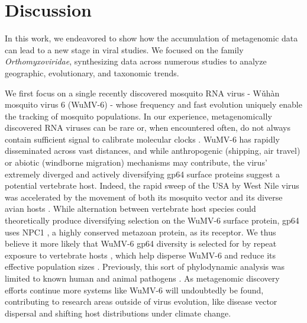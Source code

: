 \documentclass[11pt,twocolumn]{article}
\begin{document}
\section{Discussion}

In this work, we endeavored to show how the accumulation of metagenomic data can lead to a new stage in viral studies. We focused on the family \textit{Orthomyxoviridae}, synthesizing data across numerous studies to analyze geographic, evolutionary, and taxonomic trends.


We first focus on a single recently discovered mosquito RNA virus - W\v{u}h\`{a}n mosquito virus 6 \citep{li_unprecedented_2015} (WuMV-6) - whose frequency and fast evolution uniquely enable the tracking of mosquito populations. In our experience, metagenomically discovered RNA viruses can be rare or, when encountered often, do not always contain sufficient signal to calibrate molecular clocks \citep{webster_discovery_2015}. WuMV-6 has rapidly disseminated across vast distances, and while anthropogenic (shipping, air travel) \citep{lounibos_invasions_2002,fonseca_pathways_2006,bataille_evidence_2009} or abiotic (windborne migration) \citep{huestis_windborne_2019} mechanisms may contribute, the virus' extremely diverged and actively diversifying gp64 surface proteins suggest a potential vertebrate host. Indeed, the rapid sweep of the USA by West Nile virus was accelerated by the movement of both its mosquito vector and its diverse avian hosts \citep{di_giallonardo_fluid_2015}. While alternation between vertebrate host species could theoretically produce diversifying selection on the WuMV-6 surface protein, gp64 uses NPC1 \citep{li_baculovirus_2019}, a highly conserved metazoan protein, as its receptor. We thus believe it more likely that WuMV-6 gp64 diversity is selected for by repeat exposure to vertebrate hosts \citep{jong_antigenic_2007}, which help disperse WuMV-6 \citep{lycett_brief_2019} and reduce its effective population sizes \citep{bedford_strength_2011}. Previously, this sort of phylodynamic analysis was limited to known human and animal pathogens \citep{drummond_measurably_2003,wheeler_spatial_2010}. As metagenomic discovery efforts continue more systems like WuMV-6 will undoubtedly be found, contributing to research areas outside of virus evolution, like disease vector dispersal and shifting host distributions under climate change.
\end{document}
